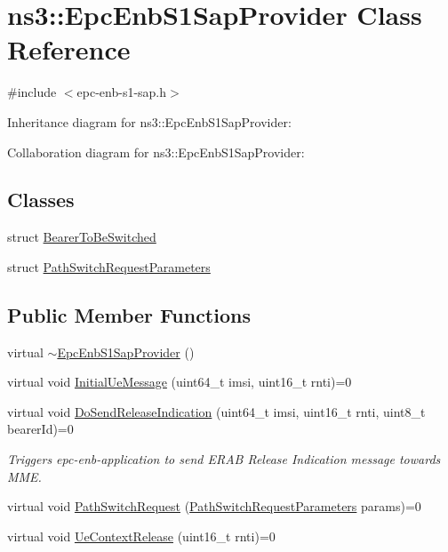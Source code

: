 \hypertarget{classns3_1_1EpcEnbS1SapProvider}{}\section{ns3\+:\+:Epc\+Enb\+S1\+Sap\+Provider Class Reference}
\label{classns3_1_1EpcEnbS1SapProvider}


{\ttfamily \#include $<$epc-\/enb-\/s1-\/sap.\+h$>$}



Inheritance diagram for ns3\+:\+:Epc\+Enb\+S1\+Sap\+Provider\+:


Collaboration diagram for ns3\+:\+:Epc\+Enb\+S1\+Sap\+Provider\+:
\subsection*{Classes}
\begin{DoxyCompactItemize}
\item 
struct \hyperlink{structns3_1_1EpcEnbS1SapProvider_1_1BearerToBeSwitched}{Bearer\+To\+Be\+Switched}
\item 
struct \hyperlink{structns3_1_1EpcEnbS1SapProvider_1_1PathSwitchRequestParameters}{Path\+Switch\+Request\+Parameters}
\end{DoxyCompactItemize}
\subsection*{Public Member Functions}
\begin{DoxyCompactItemize}
\item 
virtual \hyperlink{classns3_1_1EpcEnbS1SapProvider_a426e67f182975dabd715b2e049c054ae}{$\sim$\+Epc\+Enb\+S1\+Sap\+Provider} ()
\item 
virtual void \hyperlink{classns3_1_1EpcEnbS1SapProvider_af5e1397f498eb5b2b2e84d8a41106cac}{Initial\+Ue\+Message} (uint64\+\_\+t imsi, uint16\+\_\+t rnti)=0
\item 
virtual void \hyperlink{classns3_1_1EpcEnbS1SapProvider_a60b3f45749507d21d33d460d774bd126}{Do\+Send\+Release\+Indication} (uint64\+\_\+t imsi, uint16\+\_\+t rnti, uint8\+\_\+t bearer\+Id)=0
\begin{DoxyCompactList}\small\item\em Triggers epc-\/enb-\/application to send E\+R\+AB Release Indication message towards M\+ME. \end{DoxyCompactList}\item 
virtual void \hyperlink{classns3_1_1EpcEnbS1SapProvider_ae8a8ca13e0b7e511a2f070d196d30dbe}{Path\+Switch\+Request} (\hyperlink{structns3_1_1EpcEnbS1SapProvider_1_1PathSwitchRequestParameters}{Path\+Switch\+Request\+Parameters} params)=0
\item 
virtual void \hyperlink{classns3_1_1EpcEnbS1SapProvider_a0b36291eb6b5ceb0f5bae61fc71944d9}{Ue\+Context\+Release} (uint16\+\_\+t rnti)=0
\end{DoxyCompactItemize}


